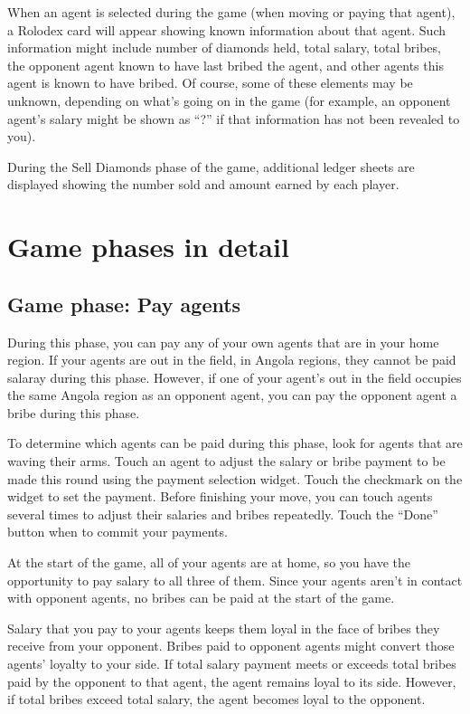 \documentclass[8pt]{extbook}
\begin{document}
When an agent is selected during the game (when moving or paying that agent), a Rolodex card will appear showing known information about that agent.  Such information might include number of diamonds held, total salary, total bribes, the opponent agent known to have last bribed the agent, and other agents this agent is known to have bribed.  Of course, some of these elements may be unknown, depending on what's going on in the game (for example, an opponent agent's salary might be shown as ``?'' if that information has not been revealed to you).

During the Sell Diamonds phase of the game, additional ledger sheets are displayed showing the number sold and amount earned by each player.





\section{Game phases in detail}

\subsection{Game phase:  Pay agents}
\label{sec:payPhase}

During this phase, you can pay any of your own agents that are in your home region.  If your agents are out in the field, in Angola regions, they cannot be paid salaray during this phase.  However, if one of your agent's out in the field occupies the same Angola region as an opponent agent, you can pay the opponent agent a bribe during this phase.

To determine which agents can be paid during this phase, look for agents that are waving their arms.  Touch an agent to adjust the salary or bribe payment to be made this round using the payment selection widget.  Touch the checkmark on the widget to set the payment.  Before finishing your move, you can touch agents several times to adjust their salaries and bribes repeatedly.  Touch the ``Done'' button when to commit your payments. 

At the start of the game, all of your agents are at home, so you have the opportunity to pay salary to all three of them.  Since your agents aren't in contact with opponent agents, no bribes can be paid at the start of the game.

Salary that you pay to your agents keeps them loyal in the face of bribes they receive from your opponent.  Bribes paid to opponent agents might convert those agents' loyalty to your side.  If total salary payment meets or exceeds total bribes paid by the opponent to that agent, the agent remains loyal to its side.  However, if total bribes exceed total salary, the agent becomes loyal to the opponent.
\end{document}
